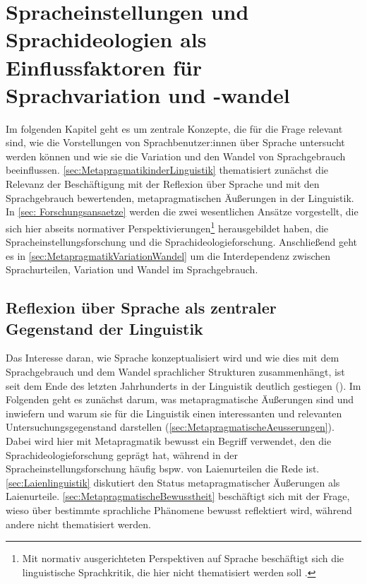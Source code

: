 \chapter[Spracheinstellungen und Sprachideologien]{Spracheinstellungen und Sprachideologien als Einflussfaktoren für Sprachvariation und -wandel}
\label{cha:SprachideologienundSpracheinstellungen}
Im folgenden Kapitel geht es um zentrale Konzepte, die für die Frage relevant sind, wie die Vorstellungen von Sprachbenutzer:innen über Sprache untersucht werden können und wie sie die Variation und den Wandel von Sprachgebrauch beeinflussen. 
\autoref{sec:MetapragmatikinderLinguistik} thematisiert zunächst die Relevanz der Beschäftigung mit der {Re\-flexion} über Sprache und mit den Sprachgebrauch bewertenden, metapragmatischen Äußerungen in der Linguistik. 
In \autoref{sec: Forschungsansaetze} werden die zwei wesentlichen Ansätze vorgestellt, die sich hier abseits normativer Perspektivierungen\footnote{Mit normativ ausgerichteten Perspektiven auf Sprache beschäftigt sich die linguistische Sprachkritik, die hier nicht thematisiert werden soll \citep[s. bspw.][]{Kilian2010}.} herausgebildet haben, die Spracheinstellungsforschung und die Sprachideologieforschung. 
Anschließend geht es in \autoref{sec:MetapragmatikVariationWandel} um die Interdependenz zwischen Sprachurteilen, Variation und Wandel im Sprachgebrauch. 

\section{Reflexion über Sprache als zentraler Gegenstand der Linguistik}
\label{sec:MetapragmatikinderLinguistik}
\largerpage

Das Interesse daran, wie Sprache konzeptualisiert wird und wie dies mit dem Sprachgebrauch und dem Wandel sprachlicher Strukturen zusammenhängt, ist seit dem Ende des letzten Jahrhunderts in der Linguistik deutlich gestiegen (\cites[s. etwa][5--6]{Jaworski.2004}[119]{Garrett.2007}). 
Im Folgenden geht es zunächst darum, was metapragmatische Äußerungen sind und inwiefern und warum sie für die Linguistik einen interessanten und relevanten Untersuchungsgegenstand darstellen (\autoref{sec:MetapragmatischeAeusserungen}). 
Dabei wird hier mit Metapragmatik bewusst ein Begriff verwendet, den die Sprachideologieforschung geprägt hat, während in der Spracheinstellungsforschung häufig bspw. von Laienurteilen die Rede ist. 
\autoref{sec:Laienlinguistik} diskutiert den  Status metapragmatischer Äußerungen als \glqq Laienurteile\grqq. \autoref{sec:MetapragmatischeBewusstheit} beschäftigt sich mit der Frage, wieso über bestimmte sprachliche Phänomene bewusst reflektiert wird, während andere nicht thematisiert werden.
